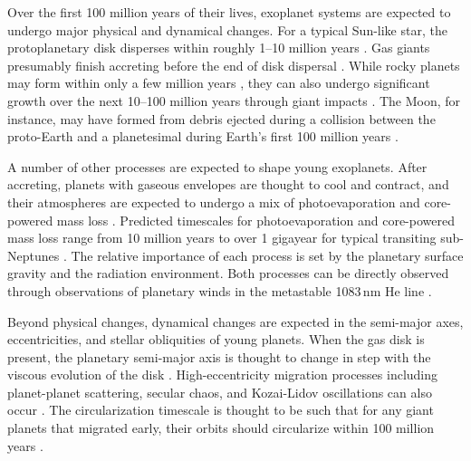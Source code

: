 \documentclass[12pt,twocolumn,tighten]{aastex63}
\begin{document}
Over the first 100 million years of their lives, exoplanet systems are
expected to undergo major physical and dynamical changes.  For a
typical Sun-like star, the protoplanetary disk disperses within
roughly 1--10 million years
\citep{mamajek_initial_2009,fedele_timescale_2010,dullemond_inner_2010,williams_protoplanetary_2011}.
Gas giants presumably finish accreting before the end of disk
dispersal \citep{pollack_formation_1996}.  While rocky planets may
form within only a few million years
\citep{dauphas_hf-w-th_2011}, they can also undergo significant growth
over the next 10--100 million years through giant impacts \citep[{\it
e.g.},][]{kleine_hf-w_2009,konig_earths_2011,morbidelli_building_2012,raymond_terrestrial_2014}.
The Moon, for instance, may have formed from debris ejected during a
collision between the proto-Earth and a planetesimal during Earth's
first 100 million years
\citep{cameron_origin_1976,canup_origin_2001,touboul_late_2007}.

A number of other processes are expected to shape young exoplanets.
After accreting, planets with gaseous envelopes are thought to cool
and contract, and their atmospheres are expected to undergo a mix of
photoevaporation and core-powered mass loss \citep[{\it
e.g.},][]{Fortney_et_al_2007,Owen_Wu_2013,Fulton_et_al_2017,gupta_sculpting_2019,gupta_signatures_2020}.
Predicted timescales for photoevaporation and core-powered mass loss
range from 10 million years to over 1 gigayear for typical transiting
sub-Neptunes
\citep{ginzburg_superearth_2016,owen_evaporation_2017,king_euv_2020}.
The relative importance of each process is set by the planetary
surface gravity and the radiation environment.  Both processes can be
directly observed through observations of planetary winds in the
metastable 1083$\,$nm He line
\citep{spake_helium_2018,oklopcic_new_2018,mansfield_detection_2018}.

Beyond physical changes, dynamical changes are expected in the
semi-major axes, eccentricities, and stellar obliquities of young
planets.  When the gas disk is present, the planetary semi-major axis
is thought to change in step with the viscous evolution of the disk
\citep{lin_orbital_1996}.  High-eccentricity migration processes
including planet-planet scattering, secular chaos, and Kozai-Lidov
oscillations can also occur \citep[{\it
e.g.},][]{fabrycky_shrinking_2007,chatterjee_dynamical_2008,lithwick_secular_2014}.
The circularization timescale is thought to be such that for any giant
planets that migrated early, their orbits should circularize within
100 million years \citep{zahn_tidal_1977}.
\end{document}
